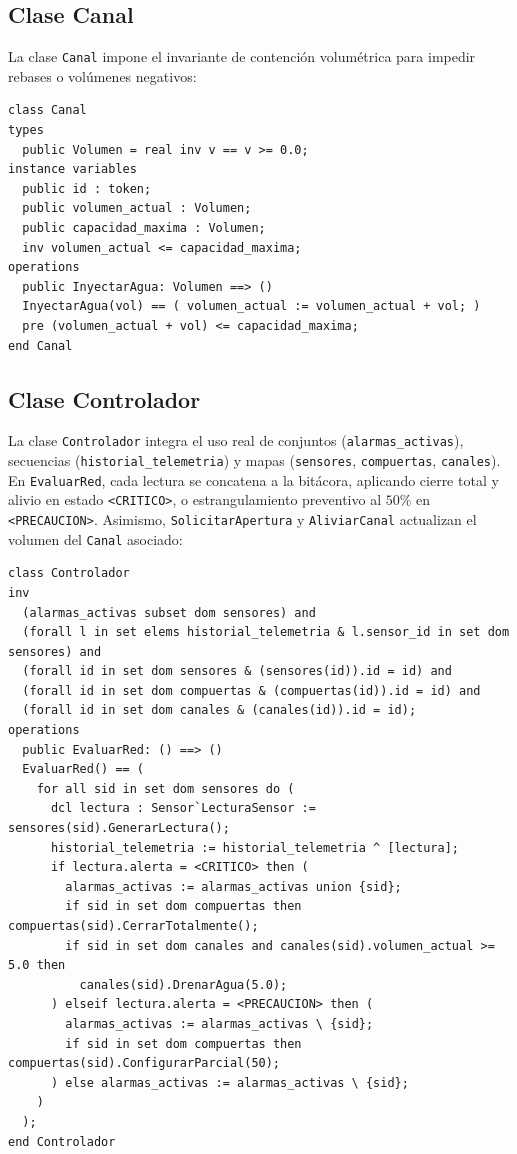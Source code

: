 \documentclass[conference]{IEEEtran}
\begin{document}
\subsection{Clase Canal}
La clase \texttt{Canal} impone el invariante de contención volumétrica para impedir rebases o volúmenes negativos:

\begin{lstlisting}[caption={Fragmento de Canal.vdmpp}]
class Canal
types
  public Volumen = real inv v == v >= 0.0;
instance variables
  public id : token;
  public volumen_actual : Volumen;
  public capacidad_maxima : Volumen;
  inv volumen_actual <= capacidad_maxima;
operations
  public InyectarAgua: Volumen ==> ()
  InyectarAgua(vol) == ( volumen_actual := volumen_actual + vol; )
  pre (volumen_actual + vol) <= capacidad_maxima;
end Canal
\end{lstlisting}

\subsection{Clase Controlador}
La clase \texttt{Controlador} integra el uso real de conjuntos (\texttt{alarmas\_activas}), secuencias (\texttt{historial\_telemetria}) y mapas (\texttt{sensores}, \texttt{compuertas}, \texttt{canales}). En \texttt{EvaluarRed}, cada lectura se concatena a la bitácora, aplicando cierre total y alivio en estado \texttt{<CRITICO>}, o estrangulamiento preventivo al $50\%$ en \texttt{<PRECAUCION>}. Asimismo, \texttt{SolicitarApertura} y \texttt{AliviarCanal} actualizan el volumen del \texttt{Canal} asociado:

\begin{lstlisting}[caption={Invariante, control por etapas e historial en Controlador.vdmpp}]
class Controlador
inv
  (alarmas_activas subset dom sensores) and
  (forall l in set elems historial_telemetria & l.sensor_id in set dom sensores) and
  (forall id in set dom sensores & (sensores(id)).id = id) and
  (forall id in set dom compuertas & (compuertas(id)).id = id) and
  (forall id in set dom canales & (canales(id)).id = id);
operations
  public EvaluarRed: () ==> ()
  EvaluarRed() == (
    for all sid in set dom sensores do (
      dcl lectura : Sensor`LecturaSensor := sensores(sid).GenerarLectura();
      historial_telemetria := historial_telemetria ^ [lectura];
      if lectura.alerta = <CRITICO> then (
        alarmas_activas := alarmas_activas union {sid};
        if sid in set dom compuertas then compuertas(sid).CerrarTotalmente();
        if sid in set dom canales and canales(sid).volumen_actual >= 5.0 then
          canales(sid).DrenarAgua(5.0);
      ) elseif lectura.alerta = <PRECAUCION> then (
        alarmas_activas := alarmas_activas \ {sid};
        if sid in set dom compuertas then compuertas(sid).ConfigurarParcial(50);
      ) else alarmas_activas := alarmas_activas \ {sid};
    )
  );
end Controlador
\end{lstlisting}
\end{document}
